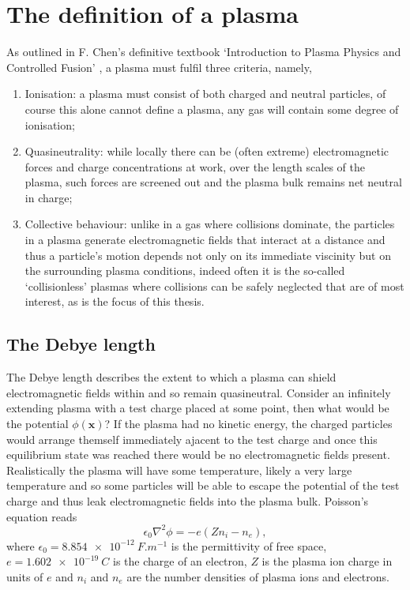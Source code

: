 \section{\label{sec:plasma_def}The definition of a plasma}
As outlined in F. Chen's definitive textbook `Introduction to Plasma Physics and Controlled Fusion' \cite{chen20116}, a plasma must fulfil three criteria, namely,

\begin{enumerate}
	\item Ionisation: a plasma must consist of both charged and neutral particles, of course this alone cannot define a plasma, any gas will contain some degree of ionisation;
	\item Quasineutrality: while locally there can be (often extreme) electromagnetic forces and charge concentrations at work, over the length scales of the plasma, such forces are screened out and the plasma bulk remains net neutral in charge;
	\item Collective behaviour: unlike in a gas where collisions dominate, the particles in a plasma generate electromagnetic fields that interact at a distance and thus a particle's motion depends not only on its immediate viscinity but on the surrounding plasma conditions, indeed often it is the so-called `collisionless' plasmas where collisions can be safely neglected that are of most interest, as is the focus of this thesis.
\end{enumerate}

\subsection{\label{sec:debye_length}The Debye length}
The Debye length describes the extent to which a plasma can shield electromagnetic fields within and so remain quasineutral. Consider an infinitely extending plasma with a test charge placed at some point, then what would be the potential $\phi(\mathbf{x})$? If the plasma had no kinetic energy, the charged particles would arrange themself immediately ajacent to the test charge and once this equilibrium state was reached there would be no electromagnetic fields present. Realistically the plasma will have some temperature, likely a very large temperature and so some particles will be able to escape the potential of the test charge and thus leak electromagnetic fields into the plasma bulk. Poisson's equation reads
\begin{equation}\label{eq:poisson}
	\epsilon_0\nabla^2\phi = -e(Zn_i - n_e),
\end{equation}
where $\epsilon_0 = \qty{8.854e-12}{F.m^{-1}}$ is the permittivity of free space, $e = \qty{1.602e-19}{C}$ is the charge of an electron, $Z$ is the plasma ion charge in units of $e$ and $n_i$ and $n_e$ are the number densities of plasma ions and electrons.

